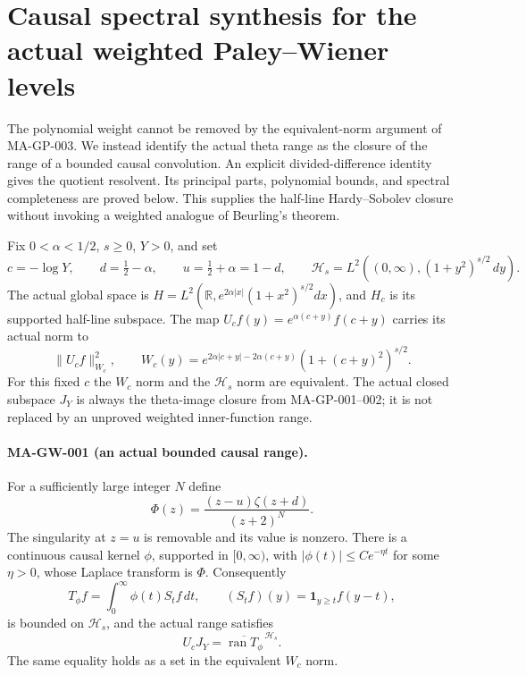 \section{Causal spectral synthesis for the actual weighted Paley--Wiener levels}
\label{sec:global-weighted-pw}

The polynomial weight cannot be removed by the equivalent-norm
argument of MA-GP-003.  We instead identify the actual theta range
as the closure of the range of a bounded causal convolution.
An explicit divided-difference identity gives the quotient
resolvent.  Its principal parts, polynomial bounds, and spectral
completeness are proved below.  This supplies the half-line
Hardy--Sobolev closure without invoking a weighted analogue
of Beurling's theorem.

Fix $0<\alpha<1/2$, $s\ge0$, $Y>0$, and set
\[
 c=-\log Y,\qquad d=\tfrac12-\alpha,\qquad
 u=\tfrac12+\alpha=1-d,\qquad
 \mathcal H_s=L^2((0,\infty),(1+y^2)^{s/2}\,dy).
 \tag{MA-GW.1}
\]
The actual global space is
$H=L^2(\mathbb R,e^{2\alpha|x|}(1+x^2)^{s/2}dx)$,
and $H_c$ is its supported half-line subspace.
The map $U_cf(y)=e^{\alpha(c+y)}f(c+y)$ carries its actual
norm to
\[
 \|U_cf\|_{W_c}^2,\qquad
 W_c(y)=e^{2\alpha|c+y|-2\alpha(c+y)}
                              (1+(c+y)^2)^{s/2}.
 \tag{MA-GW.2}
\]
For this fixed $c$ the $W_c$ norm and the $\mathcal H_s$
norm are equivalent.  The actual closed subspace $J_Y$
is always the theta-image closure from MA-GP-001--002;
it is not replaced by an unproved weighted inner-function
range.

\paragraph{MA-GW-001 (an actual bounded causal range).}
For a sufficiently large integer $N$ define
\[
               \Phi(z)=\frac{(z-u)\zeta(z+d)}{(z+2)^N}.
 \tag{MA-GW.3}
\]
The singularity at $z=u$ is removable and its value is nonzero.
There is a continuous causal kernel $\phi$, supported in
$[0,\infty)$, with $|\phi(t)|\le C e^{-\eta t}$ for some
$\eta>0$, whose Laplace transform is $\Phi$.
Consequently
\[
 T_\phi f=\int_0^\infty\phi(t)S_tf\,dt,\qquad
 (S_tf)(y)=\mathbf1_{y\ge t}f(y-t),
 \tag{MA-GW.4}
\]
is bounded on $\mathcal H_s$, and the actual range satisfies
\[
                  U_cJ_Y=\overline{\operatorname{ran}T_\phi}
                                           ^{\,\mathcal H_s}.
 \tag{MA-GW.5}
\]
The same equality holds as a set in the equivalent $W_c$ norm.

